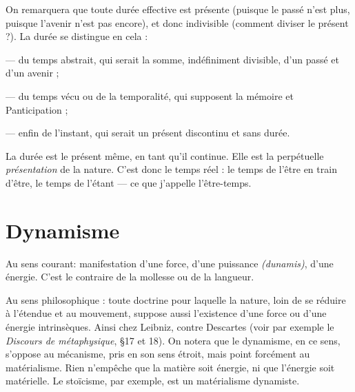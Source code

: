 On remarquera que toute durée effective est présente (puisque le passé n’est
plus, puisque l’avenir n’est pas encore), et donc indivisible (comment diviser le
présent ?). La durée se distingue en cela :

— du temps abstrait, qui serait la somme, indéfiniment divisible, d’un passé
et d’un avenir ;

— du temps vécu ou de la temporalité, qui supposent la mémoire et
Panticipation ;

— enfin de l'instant, qui serait un présent discontinu et sans durée.

La durée est le présent même, en tant qu’il continue. Elle est la perpétuelle
{\it présentation} de la nature. C’est donc le temps réel : le temps de l’être en train
d’être, le temps de l’étant — ce que j'appelle l’être-temps.

\section{Dynamisme}
Au sens courant: manifestation d’une force, d’une puissance
{\it (dunamis)}, d’une énergie. C’est le contraire de la mollesse
ou de la langueur.

Au sens philosophique : toute doctrine pour laquelle la nature, loin de se
réduire à l’étendue et au mouvement, suppose aussi l’existence d’une force ou
d’une énergie intrinsèques. Ainsi chez Leibniz, contre Descartes (voir par
exemple le {\it Discours de métaphysique}, \S 17 et 18). On notera que le dynamisme,
en ce sens, s'oppose au mécanisme, pris en son sens étroit, mais point forcément
au matérialisme. Rien n'empêche que la matière soit énergie, ni que
l'énergie soit matérielle. Le stoïcisme, par exemple, est un matérialisme dynamiste.

